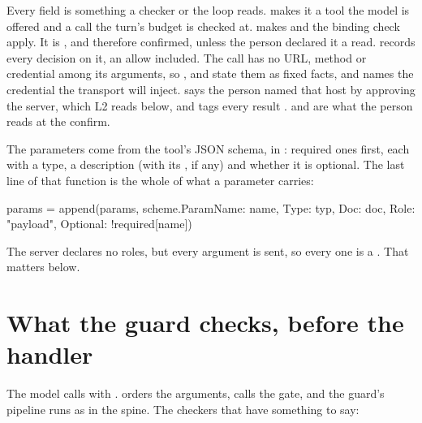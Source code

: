 Every field is something a checker or the loop reads.  makes it
a tool the model is offered and a call the turn's budget is checked at.
 makes  and the binding check apply. It is
, and therefore confirmed, unless the person declared it
a read.  records every decision on it, an allow included.
The call has no URL, method or credential among its arguments, so
,  and  state them
as fixed facts, and  names the credential the transport
will inject.  says the person named that host by
approving the server, which L2 reads below, and  tags
every result .  and 
are what the person reads at the confirm.

The parameters come from the tool's JSON schema, in
: required ones first, each with a type, a description
(with its , if any) and whether it is optional. The last line of
that function is the whole of what a parameter carries:

\begin{go}
params = append(params, scheme.Param{Name: name, Type: typ, Doc: doc, Role: "payload", Optional: !required[name]})
\end{go}

The server declares no roles, but every argument is sent, so every one is a
. That matters below.

\section{What the guard checks, before the handler}

The model calls  with
.  orders the
arguments,  calls the gate, and the guard's pipeline runs
as in the spine. The checkers that have something to say:

